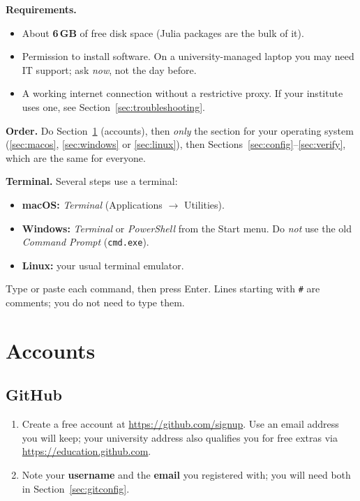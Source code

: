 \documentclass[11pt,a4paper]{article}
\newcommand{\cmd}[1]{\texttt{#1}}
\begin{document}
\textbf{Requirements.}
\begin{itemize}
  \item About \textbf{6\,GB} of free disk space (Julia packages are the bulk of it).
  \item Permission to install software. On a university-managed laptop you may need
        IT support; ask \emph{now}, not the day before.
  \item A working internet connection without a restrictive proxy. If your institute
        uses one, see Section~\ref{sec:troubleshooting}.
\end{itemize}

\textbf{Order.} Do Section~\ref{sec:accounts} (accounts), then \emph{only} the
section for your operating system (\ref{sec:macos}, \ref{sec:windows} or
\ref{sec:linux}), then Sections~\ref{sec:config}--\ref{sec:verify}, which are the
same for everyone.

\textbf{Terminal.} Several steps use a terminal:
\begin{itemize}
  \item \textbf{macOS:} \emph{Terminal} (Applications $\to$ Utilities).
  \item \textbf{Windows:} \emph{Terminal} or \emph{PowerShell} from the Start menu.
        Do \emph{not} use the old \emph{Command Prompt} (\cmd{cmd.exe}).
  \item \textbf{Linux:} your usual terminal emulator.
\end{itemize}
Type or paste each command, then press Enter. Lines starting with \cmd{\#} are
comments; you do not need to type them.

\section{Accounts}\label{sec:accounts}

\subsection{GitHub}
\begin{enumerate}
  \item Create a free account at \url{https://github.com/signup}.
        Use an email address you will keep; your university address also qualifies
        you for free extras via \url{https://education.github.com}.
  \item Note your \textbf{username} and the \textbf{email} you registered with;
        you will need both in Section~\ref{sec:gitconfig}.
\end{enumerate}
\end{document}
